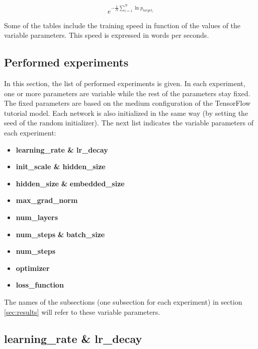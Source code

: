 \documentclass[10pt,a4paper,titlepage]{article}
\begin{document}
\[ e^{-\frac{1}{N} \sum_{i=1}^{N} \ln p_{target_{i}}} \]

\noindent
Some of the tables include the training speed in function of the values of the variable parameters. This speed is expressed in words per seconds.

\subsection{Performed experiments}
\label{subsec:perf}

In this section, the list of performed experiments is given. In each experiment, one or more parameters are variable while the rest of the parameters stay fixed. The fixed parameters are based on the medium configuration of the TensorFlow tutorial model. Each network is also initialized in the same way (by setting the seed of the random initializer). The next list indicates the variable parameters of each experiment:

\begin{itemize}
	\item \textbf{learning\_rate \& lr\_decay}
	\item \textbf{init\_scale \& hidden\_size}
	\item \textbf{hidden\_size} \textbf{\&} \textbf{embedded\_size}
	\item \textbf{max\_grad\_norm}
	\item \textbf{num\_layers}
	\item \textbf{num\_steps} \textbf{\&} \textbf{batch\_size}
	\item \textbf{num\_steps}
	\item \textbf{optimizer}
	\item \textbf{loss\_function}
\end{itemize}

\noindent
The names of the subsections (one subsection for each experiment) in section \ref{sec:results} will refer to these variable parameters.

\newpage
\subsection{learning\_rate \& lr\_decay}
\end{document}
